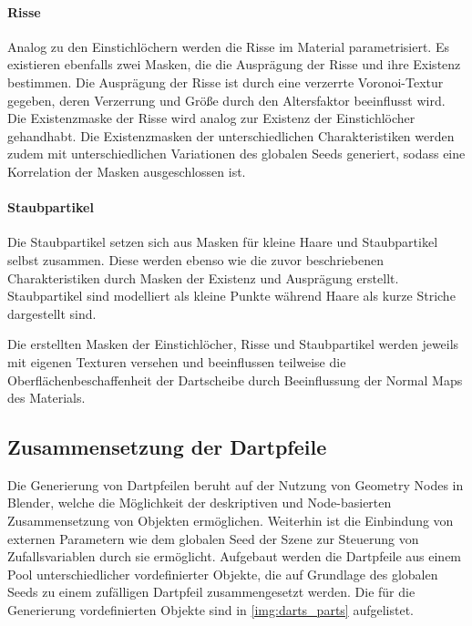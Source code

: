 \paragraph{Risse}

Analog zu den Einstichlöchern werden die Risse im Material parametrisiert. Es existieren ebenfalls zwei Masken, die die Ausprägung der Risse und ihre Existenz bestimmen. Die Ausprägung der Risse ist durch eine verzerrte Voronoi-Textur gegeben, deren Verzerrung und Größe durch den Altersfaktor beeinflusst wird. Die Existenzmaske der Risse wird analog zur Existenz der Einstichlöcher gehandhabt. Die Existenzmasken der unterschiedlichen Charakteristiken werden zudem mit unterschiedlichen Variationen des globalen Seeds generiert, sodass eine Korrelation der Masken ausgeschlossen ist.

\paragraph{Staubpartikel}

Die Staubpartikel setzen sich aus Masken für kleine Haare und Staubpartikel selbst zusammen. Diese werden ebenso wie die zuvor beschriebenen Charakteristiken durch Masken der Existenz und Ausprägung erstellt. Staubpartikel sind modelliert als kleine Punkte während Haare als kurze Striche dargestellt sind.

\vspace{\baselineskip}

\noindent Die erstellten Masken der Einstichlöcher, Risse und Staubpartikel werden jeweils mit eigenen Texturen versehen und beeinflussen teilweise die Oberflächenbeschaffenheit der Dartscheibe durch Beeinflussung der Normal Maps des Materials.

\subsection{Zusammensetzung der Dartpfeile}  %
\label{sec:dartpfeile_zusammensetzung}

Die Generierung von Dartpfeilen beruht auf der Nutzung von Geometry Nodes in Blender, welche die Möglichkeit der deskriptiven und Node-basierten Zusammensetzung von Objekten ermöglichen. Weiterhin ist die Einbindung von externen Parametern wie dem globalen Seed der Szene zur Steuerung von Zufallsvariablen durch sie ermöglicht. Aufgebaut werden die Dartpfeile aus einem Pool unterschiedlicher vordefinierter Objekte, die auf Grundlage des globalen Seeds zu einem zufälligen Dartpfeil zusammengesetzt werden. Die für die Generierung vordefinierten Objekte sind in \autoref{img:darts_parts} aufgelistet.

